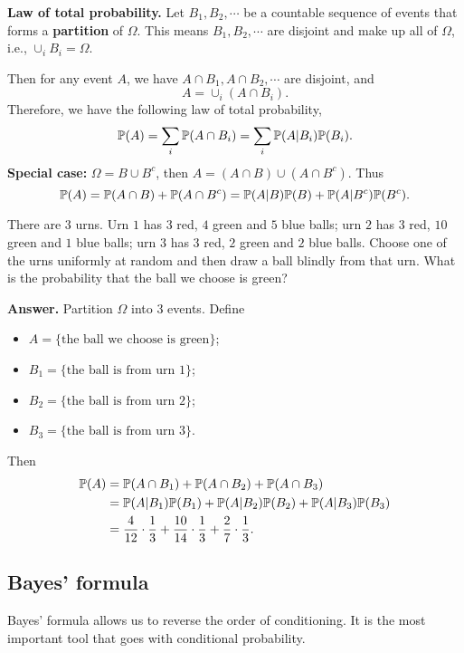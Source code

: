   
  \textbf{Law of total probability.} Let $B_1, B_2,\cdots$ be a countable
  sequence of events that forms a \textbf{partition} of $\Omega$. This means
  $B_1,B_2,\cdots$ are disjoint and make up all of $\Omega$, i.e., $\cup_iB_i = \Omega$.

  Then for any event $A$, we have $A\cap B_1, A\cap B_2,\cdots$ are disjoint,
  and
  \[
    A = \cup_i(A\cap B_i).
  \]
  Therefore, we have the following law of total probability,
  \[
    \mathbb{P}(A) = \sum_i \mathbb{P}(A\cap B_i) = \sum_i \mathbb{P}(A| B_i) \mathbb{P}(B_i).
  \]
  \textbf{Special case:} $\Omega = B\cup B^c$, then $A = (A\cap B) \cup (A\cap
  B^c)$. Thus
  \[
    \mathbb{P}(A) = \mathbb{P}(A\cap B) + \mathbb{P}(A\cap B^c) = \mathbb{P}(A|B)\mathbb{P}(B) + \mathbb{P}(A|B^c)\mathbb{P}(B^c).
  \]
  \begin{example}
    There are $3$ urns. Urn $1$ has $3$ red, $4$ green and $5$ blue balls; urn
    $2$ has $3$ red, $10$ green and $1$ blue balls; urn $3$ has $3$ red, $2$
    green and $2$ blue balls. Choose one of the urns uniformly at random and
    then draw a ball blindly from that urn. What is the probability that the
    ball we choose is green?
  \end{example}
  \textbf{Answer.} Partition $\Omega$ into $3$ events. Define
  \begin{itemize}
  \item $A = \{\text{the ball we choose is green}\}$;
  \item $B_1 = \{\text{the ball is from urn $1$}\}$;
  \item $B_2 = \{\text{the ball is from urn $2$}\}$;
  \item $B_3 = \{\text{the ball is from urn $3$}\}$.
  \end{itemize}
  Then
  \begin{align*}
    \mathbb{P}(A) & = \mathbb{P}(A\cap B_1) + \mathbb{P}(A\cap B_2) + \mathbb{P}(A\cap B_3)\\
           & = \mathbb{P}(A|B_1)\mathbb{P}(B_1) + \mathbb{P}(A|B_2)\mathbb{P}(B_2) + \mathbb{P}(A|B_3)\mathbb{P}(B_3)\\
           & = \frac{4}{12}\cdot \frac{1}{3}+\frac{10}{14}\cdot \frac{1}{3}+ \frac{2}{7}\cdot \frac{1}{3}.
  \end{align*}
  \subsection{Bayes' formula}
\label{subsec:bayes}
Bayes' formula allows us to reverse the order of conditioning. It is the most
important tool that goes with conditional probability.

